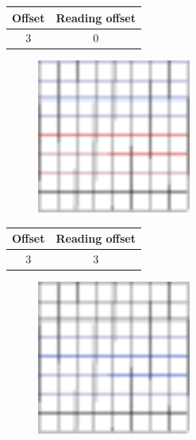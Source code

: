 \documentclass{beamer}
\begin{document}
\begin{frame}{}
    \begin{table}
        \centering
        \begin{tabular}{|c|c|}
            \hline
            Offset & Reading offset \\
            \hline
            3 & 0 \\
            \hline
        \end{tabular}
    \end{table}
    \begin{figure}
        \centering
        \includegraphics[width=0.45\textwidth]{grid_3r_2_ro_1.pdf}
        \label{fig:grid_3r_2_ro_1}
    \end{figure}
\end{frame}

\begin{frame}{}
    \begin{table}
        \centering
        \begin{tabular}{|c|c|}
            \hline
            Offset & Reading offset \\
            \hline
            3 & 3 \\
            \hline
        \end{tabular}
    \end{table}
    \begin{figure}
        \centering
        \includegraphics[width=0.45\textwidth]{grid_3r_2_ro_2.pdf}
        \label{fig:grid_3r_2_ro_2}
    \end{figure}
\end{frame}
\end{document}
